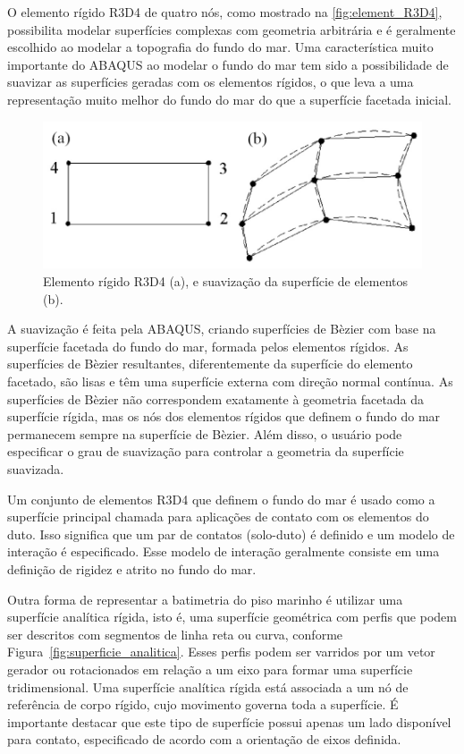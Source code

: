 

O elemento rígido R3D4 de quatro nós, como mostrado na \autoref{fig:element_R3D4}, possibilita modelar superfícies complexas com geometria arbitrária e é geralmente escolhido ao modelar a topografia do fundo do mar. Uma característica muito importante do ABAQUS ao modelar o fundo do mar tem sido a possibilidade de suavizar as superfícies geradas com os elementos rígidos, o que leva a uma representação muito melhor do fundo do mar do que a superfície facetada inicial.

\begin{figure}[!ht]
    \centering
    \caption{Elemento rígido R3D4 (a), e suavização da superfície de elementos (b).}\label{fig:element_R3D4}
    \includegraphics[width=0.7\linewidth]{imagens/element_R3D4}
\end{figure}

A suavização é feita pela ABAQUS, criando superfícies de Bèzier com base na superfície facetada do fundo do mar, formada pelos elementos rígidos. As superfícies de Bèzier resultantes, diferentemente da superfície do elemento facetado, são lisas e têm uma superfície externa com direção normal contínua. As superfícies de Bèzier não correspondem exatamente à geometria facetada da superfície rígida, mas os nós dos elementos rígidos que definem o fundo do mar permanecem sempre na superfície de Bèzier. Além disso, o usuário pode especificar o grau de suavização para controlar a geometria da superfície suavizada.

Um conjunto de elementos R3D4 que definem o fundo do mar é usado como a superfície principal chamada para aplicações de contato com os elementos do duto. Isso significa que um par de contatos (solo-duto) é definido e um modelo de interação é especificado. Esse modelo de interação geralmente consiste em uma definição de rigidez e atrito no fundo do mar.




Outra forma de representar a batimetria do piso marinho é utilizar uma superfície analítica rígida, isto é, uma superfície geométrica com perfis que podem ser descritos com segmentos de linha reta ou curva, conforme Figura~\ref{fig:superficie_analitica}.
Esses perfis podem ser varridos por um vetor gerador ou rotacionados em relação a um eixo para formar uma superfície tridimensional. Uma superfície analítica rígida está associada a um nó de referência de corpo rígido, cujo movimento governa toda a superfície.
É importante destacar que este tipo de superfície possui apenas um lado disponível para contato, especificado de acordo com a orientação de eixos definida.

